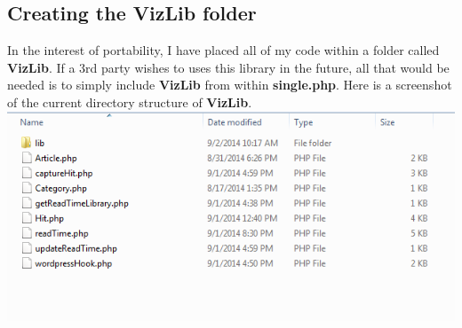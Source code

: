 \documentclass[12pt]{article}
\begin{document}
\subsection{Creating the VizLib folder}
In the interest of portability, I have placed all of my code within a folder called \textbf{VizLib}. If a 3rd party wishes to uses this library in the future, all that would be needed is to simply include \textbf{VizLib} from within \textbf{single.php}. Here is a screenshot of the current directory structure of \textbf{VizLib}. \\

\noindent\includegraphics[scale=0.8]{img/vizlib}    
\end{document}
